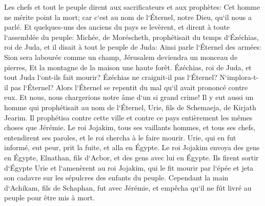 \verse Les chefs et tout le peuple dirent aux sacrificateurs et aux prophètes: Cet homme ne mérite point la mort; car c`est au nom de l`Éternel, notre Dieu, qu`il nous a parlé. 
\verse Et quelques-uns des anciens du pays se levèrent, et dirent à toute l`assemblée du peuple: 
\verse Michée, de Moréscheth, prophétisait du temps d`Ézéchias, roi de Juda, et il disait à tout le peuple de Juda: Ainsi parle l`Éternel des armées: Sion sera labourée comme un champ, Jérusalem deviendra un monceau de pierres, Et la montagne de la maison une haute forêt. 
\verse Ézéchias, roi de Juda, et tout Juda l`ont-ils fait mourir? Ézéchias ne craignit-il pas l`Éternel? N`implora-t-il pas l`Éternel? Alors l`Éternel se repentit du mal qu`il avait prononcé contre eux. Et nous, nous chargerions notre âme d`un si grand crime! 
\verse Il y eut aussi un homme qui prophétisait au nom de l`Éternel, Urie, fils de Schemaeja, de Kirjath Jearim. Il prophétisa contre cette ville et contre ce pays entièrement les mêmes choses que Jérémie. 
\verse Le roi Jojakim, tous ses vaillants hommes, et tous ses chefs, entendirent ses paroles, et le roi chercha à le faire mourir. Urie, qui en fut informé, eut peur, prit la fuite, et alla en Égypte. 
\verse Le roi Jojakim envoya des gens en Égypte, Elnathan, fils d`Acbor, et des gens avec lui en Égypte. 
\verse Ils firent sortir d`Égypte Urie et l`amenèrent au roi Jojakim, qui le fit mourir par l`épée et jeta son cadavre sur les sépulcres des enfants du peuple. 
\verse Cependant la main d`Achikam, fils de Schaphan, fut avec Jérémie, et empêcha qu`il ne fût livré au peuple pour être mis à mort. 

